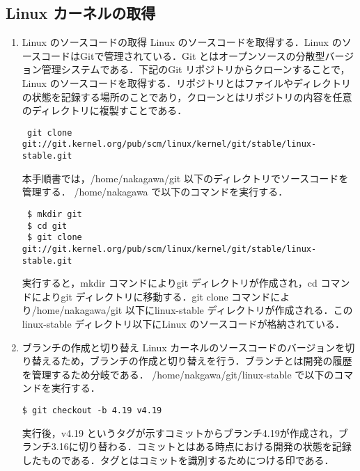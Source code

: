 \documentclass[12pt]{jsarticle}
\begin{document}
\subsection{Linux カーネルの取得}\label{sec:syutoku}
  \begin{enumerate}
  \item Linux のソースコードの取得
    Linux のソースコードを取得する．Linux のソースコードはGitで管理されている．Git とはオープンソースの分散型バージョン管理システムである．下記のGit リポジトリからクローンすることで，Linux のソースコードを取得する．リポジトリとはファイルやディレクトリの状態を記録する場所のことであり，クローンとはリポジトリの内容を任意のディレクトリに複製すことである．
\begin{verbatim}
 git clone git://git.kernel.org/pub/scm/linux/kernel/git/stable/linux-stable.git
\end{verbatim}
本手順書では，/home/nakagawa/git 以下のディレクトリでソースコードを管理する．
/home/nakagawa で以下のコマンドを実行する．
\begin{verbatim}
 $ mkdir git
 $ cd git
 $ git clone git://git.kernel.org/pub/scm/linux/kernel/git/stable/linux-stable.git
\end{verbatim}
実行すると，mkdir コマンドによりgit ディレクトリが作成され，cd コマンドによりgit ディレクトリに移動する．git clone コマンドにより/home/nakagawa/git 以下にlinux-stable ディレクトリが作成される．このlinux-stable ディレクトリ以下にLinux のソースコードが格納されている．
\item ブランチの作成と切り替え
  Linux カーネルのソースコードのバージョンを切り替えるため，ブランチの作成と切り替えを行う．ブランチとは開発の履歴を管理するため分岐である．
  /home/nakgawa/git/linux-stable で以下のコマンドを実行する．
\begin{verbatim}
$ git checkout -b 4.19 v4.19
\end{verbatim}
  実行後，v4.19 というタグが示すコミットからブランチ4.19が作成され，ブランチ3.16に切り替わる．コミットとはある時点における開発の状態を記録したものである．タグとはコミットを識別するためにつける印である．
  \end{enumerate}
\end{document}
